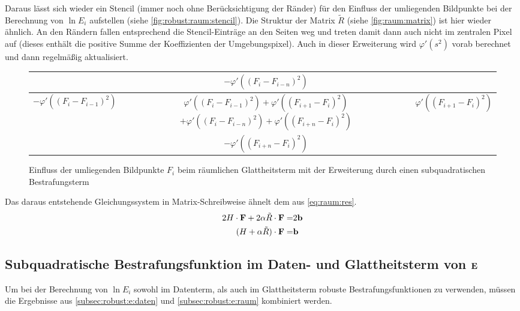 Daraus lässt sich wieder ein Stencil (immer noch ohne Berücksichtigung der Ränder) für den Einfluss der umliegenden Bildpunkte bei der Berechnung von $\ln E_i$ aufstellen (siehe \autoref{fig:robust:raum:stencil}). Die Struktur der Matrix $\tilde R$ (siehe \autoref{fig:raum:matrix}) ist hier wieder ähnlich. An den Rändern fallen entsprechend die Stencil-Einträge an den Seiten weg und treten damit dann auch nicht im zentralen Pixel auf (dieses enthält die positive Summe der Koeffizienten der Umgebungspixel). Auch in dieser Erweiterung wird $\varphi'(s^2)$ vorab berechnet und dann regelmäßig aktualisiert.

\begin{figure}
  \begin{center}
    \begin{tabular}{c|c|c}
        \cline{2-2}
        & $-\varphi'((F_i - F_{i-n})^2)$ & \\
        \hline
            \multicolumn{1}{|c|}{$-\varphi'((F_i - F_{i-1})^2)$}
            & \shortstack{$\varphi'((F_i - F_{i-1})^2) + \varphi'((F_{i+1} - F_{i})^2) $ \\
              $ +\varphi'((F_i - F_{i-n})^2) + \varphi'((F_{i+n} - F_{i})^2)$} & 
            \multicolumn{1}{c|}{$\varphi'((F_{i+1} - F_{i})^2)$}\\
        \hline
        & $-\varphi'((F_{i+n} - F_{i})^2)$ & \\
        \cline{2-2} 
    \end{tabular}
  \end{center}
\caption{Einfluss der umliegenden Bildpunkte $F_i$ beim räumlichen Glattheitsterm mit der Erweiterung durch einen subquadratischen Bestrafungsterm}
\label{fig:robust:raum:stencil}
\end{figure}

Das daraus entstehende Gleichungssystem in Matrix-Schreibweise ähnelt dem aus \autoref{eq:raum:res}. 
\begin{align}
\label{eq:robust:raum:lgs}
2 H \cdot \mathbf F + 2 \alpha \tilde R\cdot \mathbf F =& 2 \mathbf b \\
(H+\alpha \tilde R)\cdot \mathbf F =& \mathbf b
\end{align}






\subsection{Subquadratische Bestrafungsfunktion im Daten- und Glattheitsterm von $\mathbf E$ }
Um bei der Berechnung von $\ln E_i$ sowohl im Datenterm, als auch im Glattheitsterm robuste Bestrafungsfunktionen zu verwenden, müssen die Ergebnisse aus \autoref{subsec:robust:e:daten} und \autoref{subsec:robust:e:raum} kombiniert werden.


